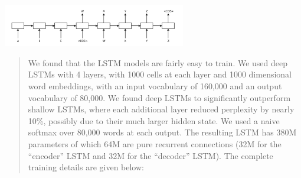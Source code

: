 \documentclass{beamer}
\begin{document}
\begin{frame}
\begin{center}
  \end{center}
\end{frame}

\begin{frame}
  \begin{center}
    \includegraphics[width=8cm]{seq2seq}
  \end{center}
\end{frame}

\begin{frame}
  \begin{quote}
    We found that the LSTM models are fairly easy to train. We used
    deep LSTMs with 4 layers, with 1000 cells at each layer and 1000
    dimensional word embeddings, with an input vocabulary of 160,000
    and an output vocabulary of 80,000. We found deep LSTMs to
    significantly outperform shallow LSTMs, where each additional
    layer reduced perplexity by nearly 10\%, possibly due to their
    much larger hidden state. We used a naive softmax over 80,000
    words at each output. The resulting LSTM has 380M parameters of
    which 64M are pure recurrent connections (32M for the “encoder”
    LSTM and 32M for the “decoder” LSTM). The complete training
    details are given below:
  \end{quote}
\end{frame}
\end{document}
